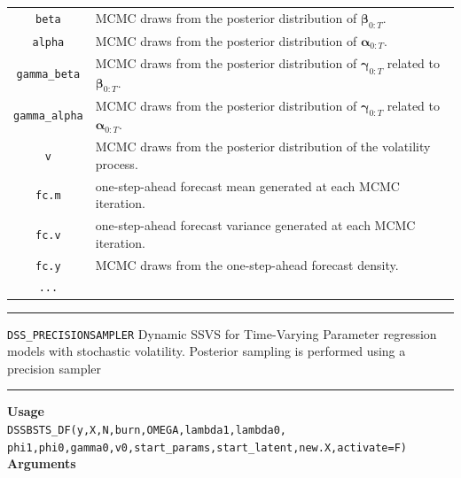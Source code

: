 \documentclass[
  12pt,
]{book}
\theoremstyle{break}
\theoremstyle{nonumberplain}
\begin{document}
\begin{small}
\begin{longtable}{ c l }
\texttt{beta} & MCMC draws from the posterior distribution of $\boldsymbol{\beta}_{0:T}$. \\
\texttt{alpha} & MCMC draws from the posterior distribution of  $\boldsymbol{\alpha}_{0:T}$. \\
\texttt{gamma\_beta} & MCMC draws from the posterior distribution of $\boldsymbol{\gamma}_{0:T}$ related to $\boldsymbol{\beta}_{0:T}$. \\
\texttt{gamma\_alpha} & MCMC draws from the posterior distribution of $\boldsymbol{\gamma}_{0:T}$ related to $\boldsymbol{\alpha}_{0:T}$. \\
\texttt{v} &  MCMC draws from the posterior distribution of the volatility process.\\
\texttt{fc.m} & one-step-ahead forecast mean generated at each MCMC iteration.\\
\texttt{fc.v} & one-step-ahead forecast variance generated at each MCMC iteration.\\
\texttt{fc.y} & MCMC draws from the one-step-ahead forecast density.\\
\texttt{...} &
\end{longtable}
\end{small}
\hrule
\vspace{1em}

\texttt{DSS\_PRECISIONSAMPLER} Dynamic SSVS for Time-Varying Parameter
regression models with stochastic volatility. Posterior sampling is
performed using a precision sampler \vspace{1em}

\hrule
\vspace{1em}

\textbf{Usage}\\
\texttt{DSSBSTS\_DF(y,X,N,burn,OMEGA,lambda1,lambda0,\\
phi1,phi0,gamma0,v0,start\_params,start\_latent,new.X,activate=F)}\\
\textbf{Arguments}\\
\end{document}
